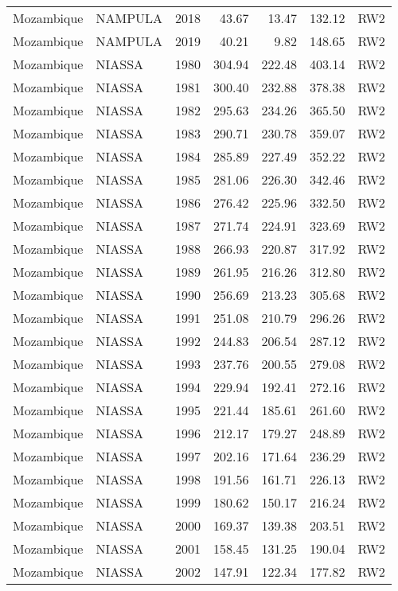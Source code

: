 \begin{longtable}{lllrrrl}
  Mozambique & NAMPULA & 2018 & 43.67 & 13.47 & 132.12 & RW2 \\ 
  Mozambique & NAMPULA & 2019 & 40.21 & 9.82 & 148.65 & RW2 \\ 
  Mozambique & NIASSA & 1980 & 304.94 & 222.48 & 403.14 & RW2 \\ 
  Mozambique & NIASSA & 1981 & 300.40 & 232.88 & 378.38 & RW2 \\ 
  Mozambique & NIASSA & 1982 & 295.63 & 234.26 & 365.50 & RW2 \\ 
  Mozambique & NIASSA & 1983 & 290.71 & 230.78 & 359.07 & RW2 \\ 
  Mozambique & NIASSA & 1984 & 285.89 & 227.49 & 352.22 & RW2 \\ 
  Mozambique & NIASSA & 1985 & 281.06 & 226.30 & 342.46 & RW2 \\ 
  Mozambique & NIASSA & 1986 & 276.42 & 225.96 & 332.50 & RW2 \\ 
  Mozambique & NIASSA & 1987 & 271.74 & 224.91 & 323.69 & RW2 \\ 
  Mozambique & NIASSA & 1988 & 266.93 & 220.87 & 317.92 & RW2 \\ 
  Mozambique & NIASSA & 1989 & 261.95 & 216.26 & 312.80 & RW2 \\ 
  Mozambique & NIASSA & 1990 & 256.69 & 213.23 & 305.68 & RW2 \\ 
  Mozambique & NIASSA & 1991 & 251.08 & 210.79 & 296.26 & RW2 \\ 
  Mozambique & NIASSA & 1992 & 244.83 & 206.54 & 287.12 & RW2 \\ 
  Mozambique & NIASSA & 1993 & 237.76 & 200.55 & 279.08 & RW2 \\ 
  Mozambique & NIASSA & 1994 & 229.94 & 192.41 & 272.16 & RW2 \\ 
  Mozambique & NIASSA & 1995 & 221.44 & 185.61 & 261.60 & RW2 \\ 
  Mozambique & NIASSA & 1996 & 212.17 & 179.27 & 248.89 & RW2 \\ 
  Mozambique & NIASSA & 1997 & 202.16 & 171.64 & 236.29 & RW2 \\ 
  Mozambique & NIASSA & 1998 & 191.56 & 161.71 & 226.13 & RW2 \\ 
  Mozambique & NIASSA & 1999 & 180.62 & 150.17 & 216.24 & RW2 \\ 
  Mozambique & NIASSA & 2000 & 169.37 & 139.38 & 203.51 & RW2 \\ 
  Mozambique & NIASSA & 2001 & 158.45 & 131.25 & 190.04 & RW2 \\ 
  Mozambique & NIASSA & 2002 & 147.91 & 122.34 & 177.82 & RW2 \\ 

\end{longtable}
